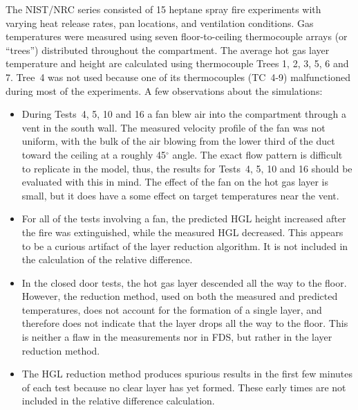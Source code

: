The NIST/NRC series consisted of 15 heptane spray fire experiments with varying heat release rates, pan locations, and ventilation conditions. Gas temperatures were measured using seven floor-to-ceiling thermocouple arrays (or ``trees'') distributed throughout the compartment.  The average hot gas layer temperature and height are calculated using thermocouple Trees 1, 2, 3, 5, 6 and 7. Tree~4 was not used because one of its thermocouples (TC~4-9) malfunctioned during most of the experiments. A few observations about the simulations:
\begin{itemize}
\item During Tests~4, 5, 10 and 16 a fan blew air into the compartment through a vent in the south wall. The measured velocity profile of the fan was not uniform, with the bulk of the air blowing from the lower third of the duct toward the ceiling at a roughly 45$^\circ$ angle.  The exact flow pattern is difficult to replicate in the model, thus, the results for Tests~4, 5, 10 and 16 should be evaluated with this in mind. The effect of the fan on the hot gas layer is small, but it does have a some effect on target temperatures near the vent.
\item For all of the tests involving a fan, the predicted HGL height increased after the fire was extinguished, while the measured HGL decreased.  This appears to be a curious artifact of the layer reduction algorithm. It is not included in the calculation of the relative difference.
\item In the closed door tests, the hot gas layer descended all the way to the floor. However, the reduction method, used on both the measured and predicted temperatures, does not account for the formation of a single layer, and therefore does not indicate that the layer drops all the way to the floor. This is neither a flaw in the measurements nor in FDS, but rather in the layer reduction method.
\item The HGL reduction method produces spurious results in the first few minutes of each test because no clear layer has yet formed. These early times are not included in the relative difference calculation.
\end{itemize}

\newpage

